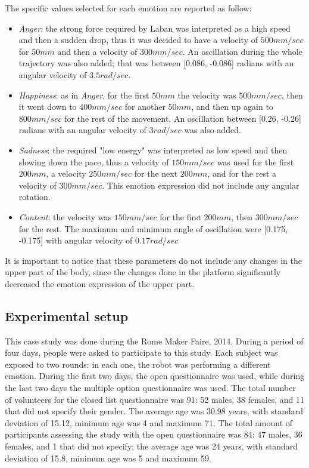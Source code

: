 The specific values selected for each emotion are reported as follow:

\begin{itemize}
	
	\item \textit{Anger}: the strong force required by Laban was interpreted as a high speed and then a sudden drop, thus it was decided to have a velocity of $500mm/sec$ for $50mm$ and then a velocity of $300mm/sec$. An oscillation during the whole trajectory was also added; that was between [0.086, -0.086] radians with an angular velocity of $3.5 rad/sec$.
	
	\item \textit{Happiness}: as in \textit{Anger}, for the first $50mm$ the velocity was $500mm/sec$, then it went down to $400mm/sec$ for another $50mm$, and then up again to $800mm/sec$ for the rest of the movement. 
	An oscillation between [0.26, -0.26] radians with an angular velocity of $3rad/sec$ was also added.
	
	\item \textit{Sadness}: the required "low energy" was interpreted as low speed and then slowing down the pace, thus a velocity of $150mm/sec$ was used for the first $200mm$, a velocity $250mm/sec$ for the next $200mm$, and for the rest a velocity of $300mm/sec$. This emotion expression did not include any angular rotation.
	
	\item \textit{Content}: the velocity was $150mm/sec$ for the first $200mm$, then $300mm/sec$ for the rest. The maximum and minimum angle of oscillation were [0.175, -0.175] with angular velocity of $0.17rad/sec$
\end{itemize}

It is important to notice that these parameters do not include any changes in the upper part of the body, since the changes done in the platform significantly decreased the emotion expression of the upper part.

\subsection{Experimental setup}

This case study was done during the Rome Maker Faire, 2014. During a period of four days, people were asked to participate to this study. Each subject was exposed to two rounds: in each one, the robot was performing a different emotion. During the first two days, the open questionnaire was used, while during the last two days the multiple option questionnaire was used. The total number of volunteers for the closed list questionnaire was 91: 52 males, 38 females, and 11 that did not specify their gender. The average age was 30.98 years, with standard deviation of 15.12, minimum age was 4 and maximum 71. The total amount of participants assessing the study with the open questionnaire was 84: 47 males, 36 females, and 1 that did not specify; the average age was 24 years, with standard deviation of 15.8, minimum age was 5 and maximum 59. 

